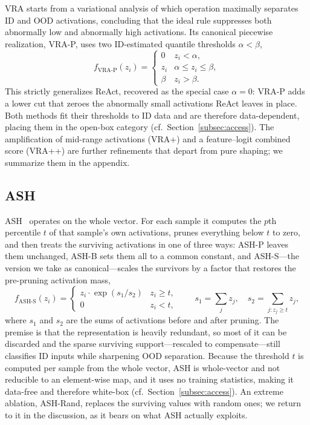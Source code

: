 \documentclass[a4paper]{article}
\begin{document}
VRA starts from a variational analysis of which operation maximally separates ID and
OOD activations, concluding that the ideal rule suppresses both abnormally low and
abnormally high activations. Its canonical piecewise realization, VRA-P, uses two
ID-estimated quantile thresholds $\alpha < \beta$,
\begin{equation}
f_{\mathrm{VRA\text{-}P}}(z_i) =
\begin{cases}
0 & z_i < \alpha, \\
z_i & \alpha \leq z_i \leq \beta, \\
\beta & z_i > \beta .
\end{cases}
\end{equation}
This strictly generalizes ReAct, recovered as the special case $\alpha = 0$: VRA-P
adds a lower cut that zeroes the abnormally small activations ReAct leaves in place.
Both methods fit their thresholds to ID data and are therefore data-dependent,
placing them in the open-box category (cf.\ Section~\ref{subsec:access}). The amplification of mid-range activations
(VRA+) and a feature--logit combined score (VRA++) are further refinements that
depart from pure shaping; we summarize them in the appendix.

\subsection{ASH}
\label{subsec:ash}

ASH~\citep{ash} operates on the whole vector. For each sample it computes the $p$th
percentile $t$ of that sample's own activations, prunes everything below $t$ to
zero, and then treats the surviving activations in one of three ways: ASH-P leaves
them unchanged, ASH-B sets them all to a common constant, and ASH-S---the version we
take as canonical---scales the survivors by a factor that restores the pre-pruning
activation mass,
\begin{equation}
\label{eq:ash}
f_{\mathrm{ASH\text{-}S}}(z_i) =
\begin{cases}
z_i \cdot \exp\!\left( s_1 / s_2 \right) & z_i \geq t,\\[2pt]
0 & z_i < t,
\end{cases}
\qquad
s_1 = \sum_j z_j, \quad s_2 = \sum_{j : z_j \geq t} z_j ,
\end{equation}
where $s_1$ and $s_2$ are the sums of activations before and after pruning. The
premise is that the representation is heavily redundant, so most of it can be
discarded and the sparse surviving support---rescaled to compensate---still
classifies ID inputs while sharpening OOD separation. Because the threshold $t$ is
computed per sample from the whole vector, ASH is whole-vector and not reducible to
an element-wise map, and it uses no training statistics, making it data-free and
therefore white-box (cf.\ Section~\ref{subsec:access}). An extreme ablation, ASH-Rand, replaces the
surviving values with random ones; we return to it in the discussion, as it bears on
what ASH actually exploits.
\end{document}
